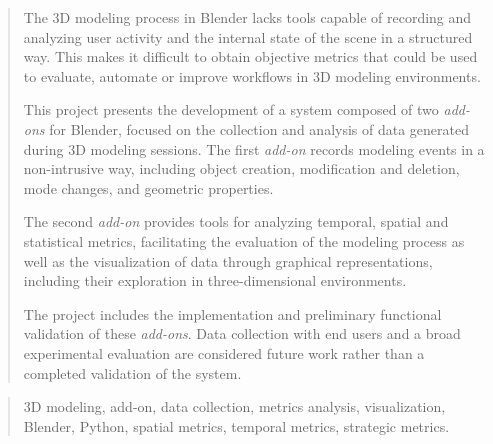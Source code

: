 \documentclass[a4paper,12pt,twoside]{memoir}
\begin{document}
\clearpage


\renewcommand*\abstractname{Abstract}
\begin{abstract}

The 3D modeling process in Blender lacks tools capable of recording and analyzing user activity and the internal state of the scene in a structured way. This makes it difficult to obtain objective metrics that could be used to evaluate, automate or improve workflows in 3D modeling environments.


This project presents the development of a system composed of two \textit{add-ons} for Blender, focused on the collection and analysis of data generated during 3D modeling sessions. The first \textit{add-on} records modeling events in a non-intrusive way, including object creation, modification and deletion, mode changes, and geometric properties.


The second \textit{add-on} provides tools for analyzing temporal, spatial and statistical metrics, facilitating the evaluation of the modeling process as well as the visualization of data through graphical representations, including their exploration in three-dimensional environments.


The project includes the implementation and preliminary functional validation of these \textit{add-ons}. Data collection with end users and a broad experimental evaluation are considered future work rather than a completed validation of the system.

\end{abstract}

\renewcommand*\abstractname{Keywords}
\begin{abstract}

3D modeling, add-on, data collection, metrics analysis, visualization, Blender, Python, spatial metrics, temporal metrics, strategic metrics.

\end{abstract}

\clearpage

\tableofcontents

\clearpage

\listoffigures

\clearpage

\listoftables
\clearpage

\mainmatter
\nocite{parnas1972criteria,bentley1975kdtree,nielsen1994usability,fayyad1996kdd,cignoni1998metro,welch,pep8,bowman2004,pressman2005,fsf_gpl3,matplotlib,botsch2010polygon,koh2010,jankowski2014,munzner2014visualization,xie2014,wiki:latex,vanderalst2016process,lavioila2017,krassmann2018,gao2021,chen2022,liu2022,mckinney2022python,casakin2023,gao2023,malik2023,3description2024,wang2024,sosna2025,blenderapi,git,github,overleaf,pythonlang,vscode}











\end{document}
